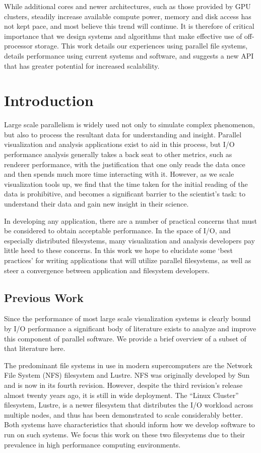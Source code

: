 While additional cores and newer architectures, such as those provided
by GPU clusters, steadily increase available compute power, memory
and disk access has not kept pace, and most believe this trend will
continue.  It is therefore of critical importance that we design
systems and algorithms that make effective use of off-processor
storage.  This work details our experiences using parallel file
systems, details performance using current systems and software,
and suggests a new API that has greater potential for increased
scalability.

\section{Introduction}

Large scale parallelism is widely used not only to simulate complex
phenomenon, but also to process the resultant data for understanding
and insight.  Parallel visualization and analysis applications exist
to aid in this process, but I/O performance analysis generally takes
a back seat to other metrics, such as renderer performance, with the
justification that one only reads the data once and then spends much
more time interacting with it.  However, as we scale visualization
tools up, we find that the time taken for the initial reading of
the data is prohibitive, and becomes a significant barrier to the
scientist's task: to understand their data and gain new insight in
their science.

In developing any application, there are a number of practical
concerns that must be considered to obtain acceptable performance.
In the space of I/O, and especially distributed filesystems, many
visualization and analysis developers pay little heed to these
concerns.  In this work we hope to elucidate some `best practices' for
writing applications that will utilize parallel filesystems, as well
as steer a convergence between application and filesystem developers.

\subsection{Previous Work}

Since the performance of most large scale visualization systems is
clearly bound by I/O performance a significant body of literature
exists to analyze and improve this component of parallel software.  We
provide a brief overview of a subset of that literature here.

The predominant file systems in use in modern supercomputers are the
Network File System (NFS) filesystem and Lustre.  NFS was originally
developed by Sun and is now in its fourth revision.  However, despite
the third revision's release almost twenty years
ago\cite{Callaghan:1995:NFSv3,Hildebrand:2004:NAHP}, it is still in
wide deployment.  The ``Linux Cluster'' filesystem,
Lustre\cite{Sun:2008:PSIW}, is a newer filesystem that distributes
the I/O workload across multiple nodes, and thus has been demonstrated
to scale considerably better.  Both systems have characteristics that
should inform how we develop software to run on such systems.  We focus
this work on these two filesystems due to their prevalence in high
performance computing environments.

